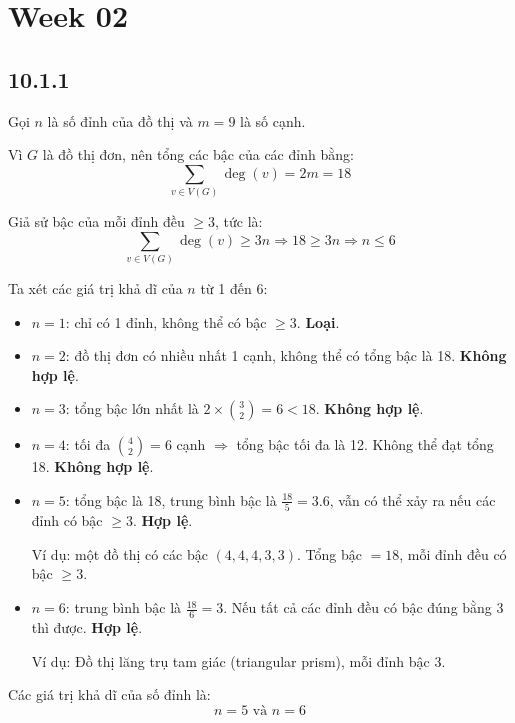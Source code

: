 \documentclass{article}
\begin{document}
	
	\newpage
	\section*{Week 02}
	\subsection*{10.1.1}
	Gọi \( n \) là số đỉnh của đồ thị và \( m = 9 \) là số cạnh.
	
	Vì \( G \) là đồ thị đơn, nên tổng các bậc của các đỉnh bằng:
	\[
	\sum_{v \in V(G)} \deg(v) = 2m = 18
	\]
	
	Giả sử bậc của mỗi đỉnh đều \( \geq 3 \), tức là:
	\[
	\sum_{v \in V(G)} \deg(v) \geq 3n \Rightarrow 18 \geq 3n \Rightarrow n \leq 6
	\]
	
	Ta xét các giá trị khả dĩ của \( n \) từ 1 đến 6:
	
	\begin{itemize}
		\item \( n = 1 \): chỉ có 1 đỉnh, không thể có bậc \( \geq 3 \). \textbf{Loại}.
		\item \( n = 2 \): đồ thị đơn có nhiều nhất 1 cạnh, không thể có tổng bậc là 18. \textbf{Không hợp lệ}.
		\item \( n = 3 \): tổng bậc lớn nhất là \( 2 \times \binom{3}{2} = 6 < 18 \). \textbf{Không hợp lệ}.
		\item \( n = 4 \): tối đa \( \binom{4}{2} = 6 \) cạnh \(\Rightarrow\) tổng bậc tối đa là 12. Không thể đạt tổng 18. \textbf{Không hợp lệ}.
		\item \( n = 5 \): tổng bậc là 18, trung bình bậc là \( \frac{18}{5} = 3.6 \), vẫn có thể xảy ra nếu các đỉnh có bậc \( \geq 3 \). \textbf{Hợp lệ}.
		
		Ví dụ: một đồ thị có các bậc \( (4,4,4,3,3) \). Tổng bậc \( = 18 \), mỗi đỉnh đều có bậc \( \geq 3 \).
		
		\item \( n = 6 \): trung bình bậc là \( \frac{18}{6} = 3 \). Nếu tất cả các đỉnh đều có bậc đúng bằng 3 thì được. \textbf{Hợp lệ}.
		
		Ví dụ: Đồ thị lăng trụ tam giác (triangular prism), mỗi đỉnh bậc 3.
	\end{itemize}
	
	Các giá trị khả dĩ của số đỉnh là:
	\[
	\boxed{n = 5 \text{ và } n = 6}
	\]
	
\end{document}
